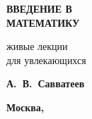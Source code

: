 \documentclass[11pt]{book}
\theoremstyle{mythm}
\theoremstyle{mydef}
\numberwithin{upr}{chapter}
\begin{document}

{\thispagestyle{empty}


\begin{flushright}
\quad

\vspace{2cm}

{\fontsize{100pt}{0pt}\bfseries\sffamily ВВЕДЕНИЕ В\\[30pt] МАТЕМАТИКУ}

\vspace{2cm}

{\fontsize{20pt}{22pt}\sffamily живые лекции\\
для увлекающихся\\[5pt]
}

\vspace{2cm}

{\Large\bfseries\sffamily 	А.~В.~Савватеев}

\vfill

{\Large\bfseries\sffamily 	Москва, \number\year}
\end{flushright}
}


\markboth{}{}

\clearpage
\renewcommand*\contentsname{\vspace{-20mm}\quad\hfill\Large\bfseries\sffamily\MakeUppercase{Содержание}\vspace{2mm}\textcolor{darkred}{\hrule}\thispagestyle{empty}}
\tableofcontents




%



\label{ENDPAGE}
\end{document}

